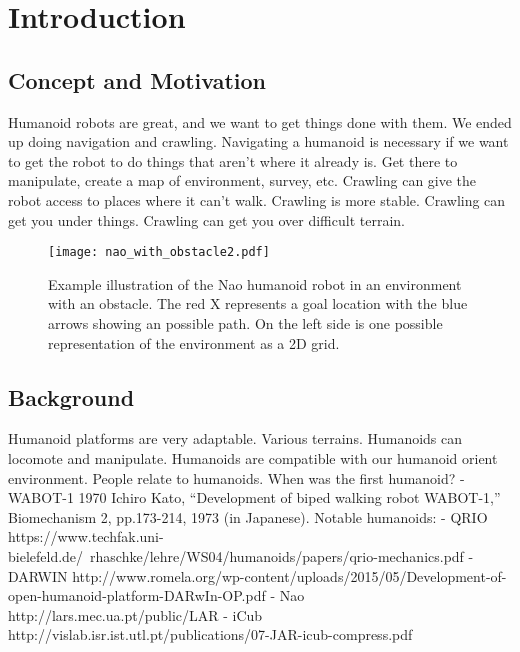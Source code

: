\chapter{Introduction} \label{ch:introduction}

\section{Concept and Motivation}
Humanoid robots are great, and we want to get things done with them.
We ended up doing navigation and crawling.
Navigating a humanoid is necessary if we want to get the robot to do things
that aren't where it already is.
Get there to manipulate, create a map of environment, survey, etc.
Crawling can give the robot access to places where it can't walk.
Crawling is more stable.
Crawling can get you under things.
Crawling can get you over difficult terrain.

\begin{figure}[h!]
	\centering
    \texttt{[image: nao\_with\_obstacle2.pdf]}
	\caption{Example illustration of the Nao humanoid robot in an environment 
             with an obstacle. The red X represents a goal location with the 
             blue arrows showing an possible path. On the left side is one 
             possible representation of the environment as a 2D grid.}
	\label{fig:nao_with_obstacle2}
\end{figure}

\section{Background}
Humanoid platforms are very adaptable. Various terrains. 
Humanoids can locomote and manipulate.
Humanoids are compatible with our humanoid orient environment.
People relate to humanoids.
When was the first humanoid?
 - WABOT-1 1970
 Ichiro Kato, “Development of biped walking robot WABOT-1,” Biomechanism 2, pp.173-214,
 1973 (in Japanese).
Notable humanoids:
- QRIO https://www.techfak.uni-bielefeld.de/~rhaschke/lehre/WS04/humanoids/papers/qrio-mechanics.pdf
- DARWIN http://www.romela.org/wp-content/uploads/2015/05/Development-of-open-humanoid-platform-DARwIn-OP.pdf
- Nao http://lars.mec.ua.pt/public/LAR%
- iCub http://vislab.isr.ist.utl.pt/publications/07-JAR-icub-compress.pdf

